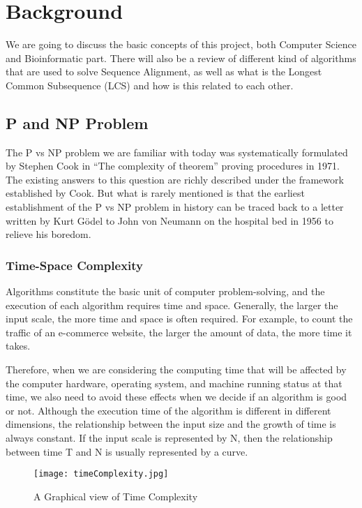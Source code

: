 \graphicspath{ {./Images/} }

\chapter{Background}

We are going to discuss the basic concepts of this project, both Computer Science and Bioinformatic part. There will
also be a review of different kind of algorithms that are used to solve Sequence Alignment, as well as what is the 
Longest Common Subsequence (LCS) and how is this related to each other. 

\section{P and NP Problem}

The P vs NP problem we are familiar with today was systematically formulated by Stephen Cook in ``The complexity of theorem'' 
proving procedures in 1971. The existing answers to this question are richly described under the framework established 
by Cook. But what is rarely mentioned is that the earliest establishment of the P vs NP problem in history can be
traced back to a letter written by Kurt Gödel to John von Neumann on the hospital bed in 1956 to relieve his boredom.


\subsection{Time-Space Complexity}

Algorithms constitute the basic unit of computer problem-solving, and the execution of each algorithm requires time 
and space. Generally, the larger the input scale, the more time and space is often required. For example, to count 
the traffic of an e-commerce website, the larger the amount of data, the more time it takes.

Therefore, when we are considering the computing time that will be affected by the computer hardware, operating system,
and machine running status at that time, we also need to avoid these effects when we decide if an algorithm is good or not.
Although the execution time of the algorithm is different in different dimensions, the relationship between the input size 
and the growth of time is always constant. If the input scale is represented by N, then the relationship between time T 
and N is usually represented by a curve.

\begin{figure}[h]
    \texttt{[image: timeComplexity.jpg]}
    \caption{A Graphical view of Time Complexity}
    \centering
\end{figure}

